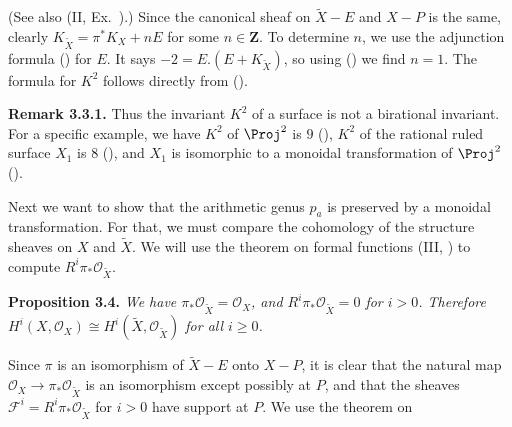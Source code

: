 {\Proof (See also (II, Ex.~).) Since the canonical sheaf on $\widetilde X-E$ and $X-P$ is the same, clearly $K_{\widetilde X}=\pi^*K_X+nE$ for some $n\in\mathbf Z$. To determine $n$, we use the adjunction formula () for $E$. It says $-2=E.(E+K_{\widetilde X})$, so using () we find $n=1$. The formula for $K^2$ follows directly from ().

\medskip
\noindent\hypertarget{result-V-3.3.1}{}\textbf{Remark 3.3.1.} Thus the invariant $K^2$ of a surface is not a birational invariant. For a specific example, we have $K^2$ of $\Proj^2$ is $9$ (), $K^2$ of the rational ruled surface $X_1$ is $8$ (), and $X_1$ is isomorphic to a monoidal transformation of $\Proj^2$ ().

\smallskip
Next we want to show that the arithmetic genus $p_a$ is preserved by a monoidal transformation. For that, we must compare the cohomology of the structure sheaves on $X$ and $\widetilde X$. We will use the theorem on formal functions (III, ) to compute $R^i\pi_*\mathcal O_{\widetilde X}$.

\medskip
\noindent\hypertarget{result-V-3.4}{}\textbf{Proposition 3.4.} \emph{We have $\pi_*\mathcal O_{\widetilde X}=\mathcal O_X$, and $R^i\pi_*\mathcal O_{\widetilde X}=0$ for $i>0$. Therefore $H^i(X,\mathcal O_X)\cong H^i(\widetilde X,\mathcal O_{\widetilde X})$ for all $i\ge0$.}

\Proof Since $\pi$ is an isomorphism of $\widetilde X-E$ onto $X-P$, it is clear that the natural map $\mathcal O_X\to\pi_*\mathcal O_{\widetilde X}$ is an isomorphism except possibly at $P$, and that the sheaves $\mathcal F^i=R^i\pi_*\mathcal O_{\widetilde X}$ for $i>0$ have support at $P$. We use the theorem on
}
